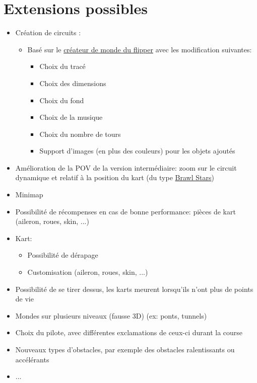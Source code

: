 \documentclass{article}
\begin{document}
\section{Extensions possibles}
\begin{itemize}
    \item Création de circuits :
          \begin{itemize}
              \item Basé sur le \href{https://lj44.ch/creator/flipper}{créateur de monde du flipper} avec les modification suivantes: \begin{itemize}
                        \item Choix du tracé
                        \item Choix des dimensions
                        \item Choix du fond
                        \item Choix de la musique
                        \item Choix du nombre de tours
                        \item Support d'images (en plus des couleurs) pour les objets ajoutés
                    \end{itemize}
          \end{itemize}
    \item Amélioration de la POV de la version intermédiaire: zoom sur le circuit dynamique et relatif à la position du kart (du type \href{https://youtu.be/ngyf3bssoKY}{Brawl Stars})
    \item Minimap
    \item Possibilité de récompenses en cas de bonne performance: pièces de kart (aileron, roues, skin, ...)
    \item Kart: \begin{itemize}
              \item Possibilité de dérapage
              \item Customisation (aileron, roues, skin, ...)
          \end{itemize}
    \item Possibilité de se tirer dessus, les karts meurent lorsqu'ils n'ont plus de points de vie
    \item Mondes sur plusieurs niveaux (fausse 3D) (ex: ponts, tunnels)
    \item Choix du pilote, avec différentes exclamations de ceux-ci durant la course
    \item Nouveaux types d'obstacles, par exemple des obstacles ralentissants ou accélérants
    \item ...
\end{itemize}

\end{document}
